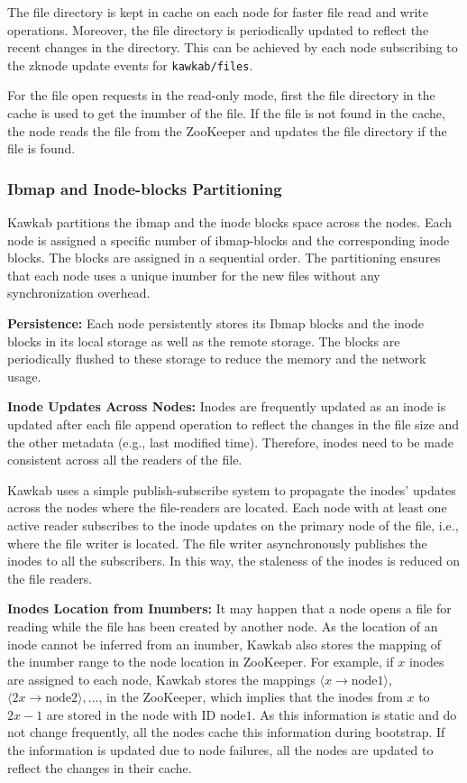 \documentclass[]{article}
\newcommand{\subtopic}[1]{\vspace{1.5pt} \noindent \textbf{#1}}
\begin{document}
{The file directory is kept in cache on each node for faster file read and write
operations. Moreover, the file directory is periodically updated to reflect the
recent changes in the directory. This can be achieved by each node subscribing
to the zknode update events for \texttt{kawkab/files}.

For the file open requests in the read-only mode, first the file directory in
the cache is used to get the inumber of the file. If the file is not found in
the cache, the node reads the file from the ZooKeeper and updates the file
directory if the file is found.



\subsubsection{Ibmap and Inode-blocks Partitioning} Kawkab partitions the ibmap
and the inode blocks space across the nodes. Each node is assigned a specific
number of ibmap-blocks and the corresponding inode blocks.
The blocks are assigned in a sequential order. The partitioning ensures that
each node uses a unique inumber for the new files without any synchronization
overhead.

\subtopic{Persistence:} Each node persistently stores its Ibmap blocks and the
inode blocks in its local storage as well as the remote storage. The blocks are
periodically flushed to these storage to reduce the memory and the network usage.

\subtopic{Inode Updates Across Nodes:} Inodes are frequently updated as an inode is
updated after each file append operation to reflect the changes in the file
size and the other metadata (e.g., last modified time).  Therefore, inodes need
to be made consistent across all the readers of the file.

Kawkab uses a simple publish-subscribe system to propagate the inodes' updates
across the nodes where the file-readers are located. Each node with
at least one active reader subscribes to the inode updates on the primary node
of the file, i.e., where the file writer is located. The file writer 
asynchronously publishes the inodes to all the subscribers. In this way,
the staleness of the inodes is reduced on the file readers.


\subtopic{Inodes Location from Inumbers:} It may happen that a node opens a
file for reading while the file has been created by another node. As the
location of an inode cannot be inferred from an inumber, Kawkab also stores the
mapping of the inumber range to the node location in ZooKeeper.  For example,
if $x$ inodes are assigned to each node, Kawkab stores the mappings $\langle x
\to \mathrm{node1} \rangle$, $\langle 2x \to \mathrm{node2} \rangle, \ldots$,
in the ZooKeeper, which implies that the inodes from $x$ to $2x-1$ are stored
in the node with ID $\mathrm{node1}$. As this information is static and do not
change frequently, all the nodes cache this information during bootstrap. If
the information is updated due to node failures, all the nodes are updated to
reflect the changes in their cache.



}
\end{document}
